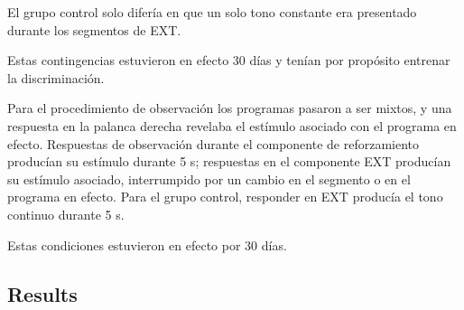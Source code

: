 \documentclass[a4paper,12pt]{article}
\begin{document}
El grupo control solo difería en que un solo tono constante era presentado durante los segmentos de EXT.

Estas contingencias estuvieron en efecto 30 días y tenían por propósito entrenar la discriminación.

Para el procedimiento de observación los programas pasaron a ser mixtos, y una respuesta en la palanca derecha revelaba el estímulo asociado con el programa en efecto.
Respuestas de observación durante el componente de reforzamiento producían su estímulo durante 5 s; respuestas en el componente EXT producían su estímulo asociado, interrumpido por un cambio en el segmento o en el programa en efecto.
Para el grupo control, responder en EXT producía el tono continuo durante 5 s.

Estas condiciones estuvieron en efecto por 30 días.

\subsection{Results}
\end{document}
